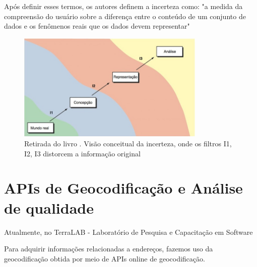Após definir esses termos, os autores definem a incerteza como: "a medida da compreensão do usuário sobre a diferença entre o conteúdo de um conjunto de dados e os fenômenos reais que os dados devem representar" %

\begin{figure}[ht]
   \centering
   \includegraphics[width=0.8\textwidth]{Figuras/incertezaLivro.jpeg}
   \caption{Retirada do livro \cite{longley2013}. Visão conceitual da incerteza, onde os filtros I1, I2, I3 distorcem a informação original}
   \label{fig:incerteza}
\end{figure}

\section{APIs de Geocodificação e Análise de qualidade}

Atualmente, no TerraLAB - Laboratório de Pesquisa e Capacitação em Software %

Para adquirir informações relacionadas a endereços, fazemos uso da geocodificação obtida por meio de APIs online de geocodificação.

